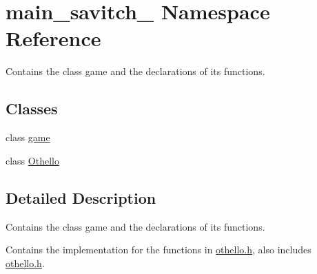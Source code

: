 \hypertarget{namespacemain__savitch__14}{}\section{main\+\_\+savitch\+\_ Namespace Reference}
\label{namespacemain__savitch__14}


Contains the class game and the declarations of its functions.  


\subsection*{Classes}
\begin{DoxyCompactItemize}
\item 
class \mbox{\hyperlink{classmain__savitch__14_1_1game}{game}}
\item 
class \mbox{\hyperlink{classmain__savitch__14_1_1_othello}{Othello}}
\end{DoxyCompactItemize}


\subsection{Detailed Description}
Contains the class game and the declarations of its functions. 

Contains the implementation for the functions in \mbox{\hyperlink{othello_8h_source}{othello.\+h}}, also includes \mbox{\hyperlink{othello_8h_source}{othello.\+h}}. 